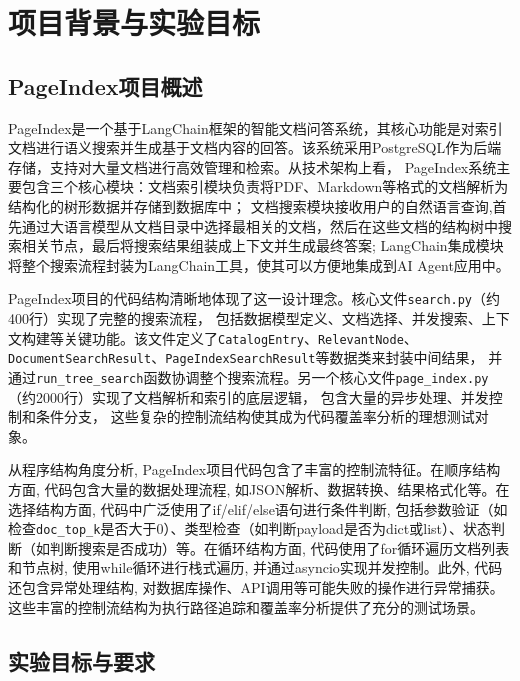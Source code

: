 
\chapter{项目背景与实验目标}
\label{chap:background}

\section{PageIndex项目概述}

PageIndex是一个基于LangChain框架的智能文档问答系统，其核心功能是对索引文档进行语义搜索并生成基于文档内容的回答。该系统采用PostgreSQL作为后端存储，支持对大量文档进行高效管理和检索。从技术架构上看， PageIndex系统主要包含三个核心模块：文档索引模块负责将PDF、Markdown等格式的文档解析为结构化的树形数据并存储到数据库中； 文档搜索模块接收用户的自然语言查询,首先通过大语言模型从文档目录中选择最相关的文档，然后在这些文档的结构树中搜索相关节点，最后将搜索结果组装成上下文并生成最终答案; LangChain集成模块将整个搜索流程封装为LangChain工具，使其可以方便地集成到AI Agent应用中。

PageIndex项目的代码结构清晰地体现了这一设计理念。核心文件\texttt{search.py}（约400行）实现了完整的搜索流程， 包括数据模型定义、文档选择、并发搜索、上下文构建等关键功能。该文件定义了\texttt{CatalogEntry}、\texttt{RelevantNode}、\texttt{DocumentSearchResult}、\texttt{PageIndexSearchResult}等数据类来封装中间结果， 并通过\texttt{run\_tree\_search}函数协调整个搜索流程。另一个核心文件\texttt{page\_index.py}（约2000行）实现了文档解析和索引的底层逻辑， 包含大量的异步处理、并发控制和条件分支， 这些复杂的控制流结构使其成为代码覆盖率分析的理想测试对象。

从程序结构角度分析, PageIndex项目代码包含了丰富的控制流特征。在顺序结构方面, 代码包含大量的数据处理流程, 如JSON解析、数据转换、结果格式化等。在选择结构方面, 代码中广泛使用了if/elif/else语句进行条件判断, 包括参数验证（如检查\texttt{doc\_top\_k}是否大于0）、类型检查（如判断payload是否为dict或list）、状态判断（如判断搜索是否成功）等。在循环结构方面, 代码使用了for循环遍历文档列表和节点树, 使用while循环进行栈式遍历, 并通过asyncio实现并发控制。此外, 代码还包含异常处理结构, 对数据库操作、API调用等可能失败的操作进行异常捕获。这些丰富的控制流结构为执行路径追踪和覆盖率分析提供了充分的测试场景。

\section{实验目标与要求}


